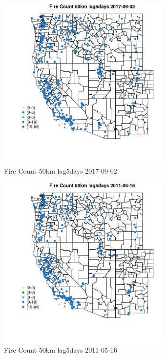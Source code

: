 \begin{figure} 
\centering  
\includegraphics[width=0.77\textwidth]{Code_Outputs/Report_ML_input_PM25_Step4_part_e_de_duplicated_aves_compiled_2019-05-21wNAs_MapObsFire_Count_50km_lag5days2017-09-02.jpg} 
\caption{\label{fig:Report_ML_input_PM25_Step4_part_e_de_duplicated_aves_compiled_2019-05-21wNAsMapObsFire_Count_50km_lag5days2017-09-02}Fire Count 50km lag5days 2017-09-02} 
\end{figure} 
 

\begin{figure} 
\centering  
\includegraphics[width=0.77\textwidth]{Code_Outputs/Report_ML_input_PM25_Step4_part_e_de_duplicated_aves_compiled_2019-05-21wNAs_MapObsFire_Count_50km_lag5days2011-05-16.jpg} 
\caption{\label{fig:Report_ML_input_PM25_Step4_part_e_de_duplicated_aves_compiled_2019-05-21wNAsMapObsFire_Count_50km_lag5days2011-05-16}Fire Count 50km lag5days 2011-05-16} 
\end{figure} 
 

